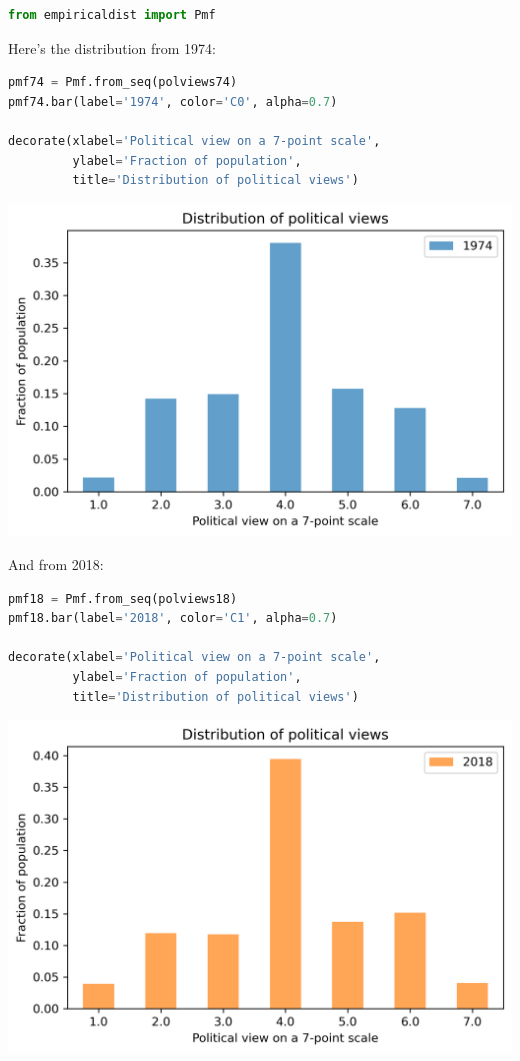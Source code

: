 \begin{lstlisting}[language=Python,style=source]
from empiricaldist import Pmf
\end{lstlisting}

Here's the distribution from 1974:

\begin{lstlisting}[language=Python,style=source]
pmf74 = Pmf.from_seq(polviews74)
pmf74.bar(label='1974', color='C0', alpha=0.7)

decorate(xlabel='Political view on a 7-point scale',
         ylabel='Fraction of population',
         title='Distribution of political views')
\end{lstlisting}

\begin{center}
\includegraphics[scale=0.75]{02_polviews_soln_files/02_polviews_soln_32_0.png}
\end{center}

And from 2018:

\begin{lstlisting}[language=Python,style=source]
pmf18 = Pmf.from_seq(polviews18)
pmf18.bar(label='2018', color='C1', alpha=0.7)

decorate(xlabel='Political view on a 7-point scale',
         ylabel='Fraction of population',
         title='Distribution of political views')
\end{lstlisting}

\begin{center}
\includegraphics[scale=0.75]{02_polviews_soln_files/02_polviews_soln_34_0.png}
\end{center}

